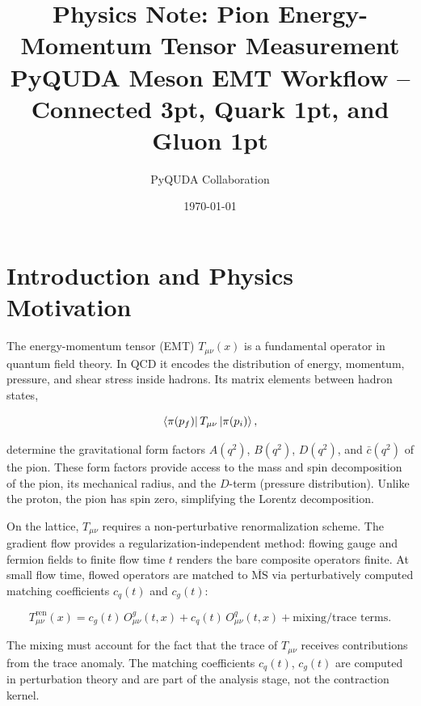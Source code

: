 \documentclass[11pt,a4paper]{article}
\title{
  \textbf{Physics Note: Pion Energy-Momentum Tensor Measurement}\\[4pt]
  \large PyQUDA Meson EMT Workflow -- Connected 3pt, Quark 1pt, and Gluon 1pt
}
\author{
  PyQUDA Collaboration
}
\date{\today}
\begin{document}
\maketitle
\tableofcontents
\newpage

\section{Introduction and Physics Motivation}

The energy-momentum tensor (EMT) $T_{\mu\nu}(x)$ is a fundamental operator in quantum field theory. In QCD it encodes the distribution of energy, momentum, pressure, and shear stress inside hadrons. Its matrix elements between hadron states,

\begin{equation}
  \bra{\pi(p_f)} T_{\mu\nu} \ket{\pi(p_i)},
\end{equation}

determine the gravitational form factors $A(q^2)$, $B(q^2)$, $D(q^2)$, and $\bar{c}(q^2)$ of the pion. These form factors provide access to the mass and spin decomposition of the pion, its mechanical radius, and the $D$-term (pressure distribution). Unlike the proton, the pion has spin zero, simplifying the Lorentz decomposition.

On the lattice, $T_{\mu\nu}$ requires a non-perturbative renormalization scheme. The gradient flow \cite{Luscher:2010iy,Luscher:2013vga} provides a regularization-independent method: flowing gauge and fermion fields to finite flow time $t$ renders the bare composite operators finite. At small flow time, flowed operators are matched to $\overline{\text{MS}}$ via perturbatively computed matching coefficients $c_q(t)$ and $c_g(t)$:

\begin{equation}\label{eq:renorm_ansatz}
  T_{\mu\nu}^{\text{ren}}(x)
    = c_g(t)\, O_{\mu\nu}^g(t,x)
    + c_q(t)\, O_{\mu\nu}^q(t,x)
    + \text{mixing/trace terms}.
\end{equation}

The mixing must account for the fact that the trace of $T_{\mu\nu}$ receives contributions from the trace anomaly. The matching coefficients $c_q(t)$, $c_g(t)$ are computed in perturbation theory and are part of the analysis stage, not the contraction kernel.
\end{document}

